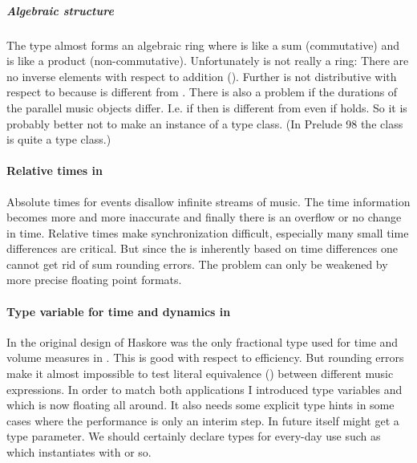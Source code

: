 \subparagraph*{Algebraic structure}

The type  almost forms an algebraic ring
where \code{=:=} is like a sum (commutative) and
\code{+:+} is like a product (non-commutative).
Unfortunately  is not really a ring:
There are no inverse elements with respect to addition (\code{=:=}).
Further \code{=:=} is not distributive with respect to \code{+:+}
because  is different from .
There is also a problem if the durations
of the parallel music objects differ.
I.e. if 
then  is different from
even if  holds.
So it is probably better not to make 
an instance of a  type class.
(In Prelude 98 the class  is quite a  type class.)

\paragraph*{Relative times in }


Absolute times for events disallow infinite streams of music.
The time information becomes more and more inaccurate
and finally there is an overflow or no change in time.
Relative times make synchronization difficult,
especially many small time differences are critical.
But since the  is inherently based on time differences
one cannot get rid of sum rounding errors.
The problem can only be weakened by more precise floating point formats.


\paragraph*{Type variable for time and dynamics in }

In the original design of Haskore
 was the only fractional type
used for time and volume measures in .
This is good with respect to efficiency.
But rounding errors make it almost impossible
to test literal equivalence ()
between different music expressions.
In order to match both applications
I introduced type variables  and 
which is now floating all around.
It also needs some explicit type hints in some cases
where the performance is only an interim step.
In future  itself might get a  type parameter.
We should certainly declare types for every-day use
such as  which instantiates 
with  or so.


